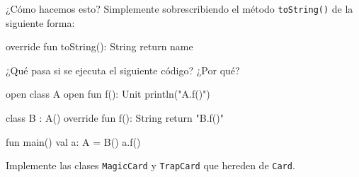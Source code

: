   ¿Cómo hacemos esto?
  Simplemente sobrescribiendo el método \texttt{toString()} de la siguiente forma:

  \begin{kotlin}
    override fun toString(): String {
      return name
    }  
  \end{kotlin}

  \begin{exercise}
    ¿Qué pasa si se ejecuta el siguiente código?
    ¿Por qué?

    \begin{kotlin}
      open class A {
        open fun f(): Unit {
          println("A.f()")
        }
      }

      class B : A() {
        override fun f(): String {
          return "B.f()"
        }
      }
      
      fun main() {
        val a: A = B()
        a.f()
      }
    \end{kotlin}
  \end{exercise}

  \begin{exercise}
    Implemente las clases \texttt{MagicCard} y \texttt{TrapCard} que hereden de \texttt{Card}.
  \end{exercise}
